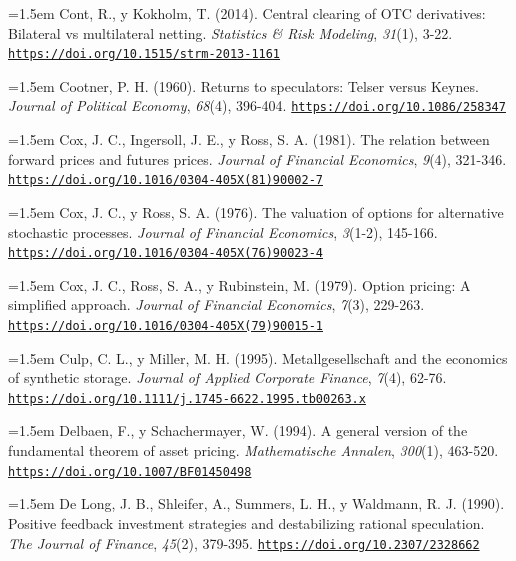 \documentclass[10pt,a4paper]{article}
\begin{document}
\noindent\hangindent=1.5em Cont, R., y Kokholm, T. (2014). Central clearing of OTC derivatives: Bilateral vs multilateral netting. \textit{Statistics \& Risk Modeling}, \textit{31}(1), 3-22. \href{https://doi.org/10.1515/strm-2013-1161}{\nolinkurl{https://doi.org/10.1515/strm-2013-1161}}

\noindent\hangindent=1.5em Cootner, P. H. (1960). Returns to speculators: Telser versus Keynes. \textit{Journal of Political Economy}, \textit{68}(4), 396-404. \href{https://doi.org/10.1086/258347}{\nolinkurl{https://doi.org/10.1086/258347}}

\noindent\hangindent=1.5em Cox, J. C., Ingersoll, J. E., y Ross, S. A. (1981). The relation between forward prices and futures prices. \textit{Journal of Financial Economics}, \textit{9}(4), 321-346. \href{https://doi.org/10.1016/0304-405X(81)90002-7}{\nolinkurl{https://doi.org/10.1016/0304-405X(81)90002-7}}

\noindent\hangindent=1.5em Cox, J. C., y Ross, S. A. (1976). The valuation of options for alternative stochastic processes. \textit{Journal of Financial Economics}, \textit{3}(1-2), 145-166. \href{https://doi.org/10.1016/0304-405X(76)90023-4}{\nolinkurl{https://doi.org/10.1016/0304-405X(76)90023-4}}

\noindent\hangindent=1.5em Cox, J. C., Ross, S. A., y Rubinstein, M. (1979). Option pricing: A simplified approach. \textit{Journal of Financial Economics}, \textit{7}(3), 229-263. \href{https://doi.org/10.1016/0304-405X(79)90015-1}{\nolinkurl{https://doi.org/10.1016/0304-405X(79)90015-1}}

\noindent\hangindent=1.5em Culp, C. L., y Miller, M. H. (1995). Metallgesellschaft and the economics of synthetic storage. \textit{Journal of Applied Corporate Finance}, \textit{7}(4), 62-76. \href{https://doi.org/10.1111/j.1745-6622.1995.tb00263.x}{\nolinkurl{https://doi.org/10.1111/j.1745-6622.1995.tb00263.x}}

\noindent\hangindent=1.5em Delbaen, F., y Schachermayer, W. (1994). A general version of the fundamental theorem of asset pricing. \textit{Mathematische Annalen}, \textit{300}(1), 463-520. \href{https://doi.org/10.1007/BF01450498}{\nolinkurl{https://doi.org/10.1007/BF01450498}}

\noindent\hangindent=1.5em De Long, J. B., Shleifer, A., Summers, L. H., y Waldmann, R. J. (1990). Positive feedback investment strategies and destabilizing rational speculation. \textit{The Journal of Finance}, \textit{45}(2), 379-395. \href{https://doi.org/10.2307/2328662}{\nolinkurl{https://doi.org/10.2307/2328662}}
\end{document}
